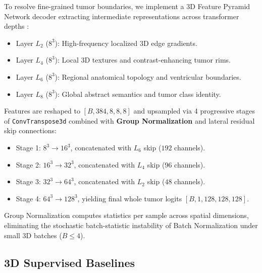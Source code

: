 \documentclass{article}
\begin{document}
To resolve fine-grained tumor boundaries, we implement a 3D Feature Pyramid Network decoder extracting intermediate representations across transformer depths \citep{lin2017feature,hatamizadeh2022unetr}:
\begin{itemize}
    \item Layer $L_2$ ($8^3$): High-frequency localized 3D edge gradients.
    \item Layer $L_4$ ($8^3$): Local 3D textures and contrast-enhancing tumor rims.
    \item Layer $L_6$ ($8^3$): Regional anatomical topology and ventricular boundaries.
    \item Layer $L_8$ ($8^3$): Global abstract semantics and tumor class identity.
\end{itemize}
Features are reshaped to $[B, 384, 8, 8, 8]$ and upsampled via 4 progressive stages of \texttt{ConvTranspose3d} combined with \textbf{Group Normalization} \citep{wu2018group} and lateral residual skip connections:
\begin{itemize}
    \item Stage 1: $8^3 \to 16^3$, concatenated with $L_6$ skip ($192$ channels).
    \item Stage 2: $16^3 \to 32^3$, concatenated with $L_4$ skip ($96$ channels).
    \item Stage 3: $32^3 \to 64^3$, concatenated with $L_2$ skip ($48$ channels).
    \item Stage 4: $64^3 \to 128^3$, yielding final whole tumor logits $[B, 1, 128, 128, 128]$.
\end{itemize}
Group Normalization computes statistics per sample across spatial dimensions, eliminating the stochastic batch-statistic instability of Batch Normalization under small 3D batches ($B \le 4$).

\subsection{3D Supervised Baselines}
\end{document}
